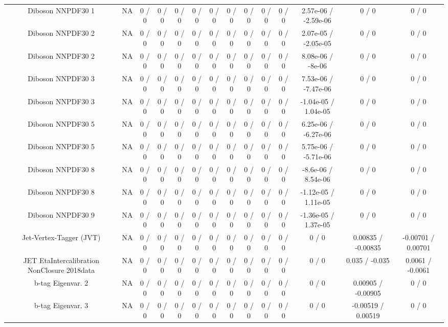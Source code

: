 \documentclass[10pt]{article}
\begin{document}
\begin{table}[htbp]
\begin{center}
\begin{tabular}{|c|c|c|c|c|c|c|c|c|c|c|c|c|c|}
  Diboson NNPDF30 1 &    NA    & 0 / 0 & 0 / 0 & 0 / 0 & 0 / 0 & 0 / 0 & 0 / 0 & 0 / 0 & 0 / 0 & 0 / 0 & 2.57e-06 / -2.59e-06 & 0 / 0 & 0 / 0 \\ 
  Diboson NNPDF30 2 &    NA    & 0 / 0 & 0 / 0 & 0 / 0 & 0 / 0 & 0 / 0 & 0 / 0 & 0 / 0 & 0 / 0 & 0 / 0 & 2.07e-05 / -2.05e-05 & 0 / 0 & 0 / 0 \\ 
  Diboson NNPDF30 2 &    NA    & 0 / 0 & 0 / 0 & 0 / 0 & 0 / 0 & 0 / 0 & 0 / 0 & 0 / 0 & 0 / 0 & 0 / 0 & 8.08e-06 / -8e-06 & 0 / 0 & 0 / 0 \\ 
  Diboson NNPDF30 3 &    NA    & 0 / 0 & 0 / 0 & 0 / 0 & 0 / 0 & 0 / 0 & 0 / 0 & 0 / 0 & 0 / 0 & 0 / 0 & 7.53e-06 / -7.47e-06 & 0 / 0 & 0 / 0 \\ 
  Diboson NNPDF30 3 &    NA    & 0 / 0 & 0 / 0 & 0 / 0 & 0 / 0 & 0 / 0 & 0 / 0 & 0 / 0 & 0 / 0 & 0 / 0 & -1.04e-05 / 1.04e-05 & 0 / 0 & 0 / 0 \\ 
  Diboson NNPDF30 5 &    NA    & 0 / 0 & 0 / 0 & 0 / 0 & 0 / 0 & 0 / 0 & 0 / 0 & 0 / 0 & 0 / 0 & 0 / 0 & 6.25e-06 / -6.27e-06 & 0 / 0 & 0 / 0 \\ 
  Diboson NNPDF30 5 &    NA    & 0 / 0 & 0 / 0 & 0 / 0 & 0 / 0 & 0 / 0 & 0 / 0 & 0 / 0 & 0 / 0 & 0 / 0 & 5.75e-06 / -5.71e-06 & 0 / 0 & 0 / 0 \\ 
  Diboson NNPDF30 8 &    NA    & 0 / 0 & 0 / 0 & 0 / 0 & 0 / 0 & 0 / 0 & 0 / 0 & 0 / 0 & 0 / 0 & 0 / 0 & -8.6e-06 / 8.54e-06 & 0 / 0 & 0 / 0 \\ 
  Diboson NNPDF30 8 &    NA    & 0 / 0 & 0 / 0 & 0 / 0 & 0 / 0 & 0 / 0 & 0 / 0 & 0 / 0 & 0 / 0 & 0 / 0 & -1.12e-05 / 1.11e-05 & 0 / 0 & 0 / 0 \\ 
  Diboson NNPDF30 9 &    NA    & 0 / 0 & 0 / 0 & 0 / 0 & 0 / 0 & 0 / 0 & 0 / 0 & 0 / 0 & 0 / 0 & 0 / 0 & -1.36e-05 / 1.37e-05 & 0 / 0 & 0 / 0 \\ 
  Jet-Vertex-Tagger (JVT) &    NA    & 0 / 0 & 0 / 0 & 0 / 0 & 0 / 0 & 0 / 0 & 0 / 0 & 0 / 0 & 0 / 0 & 0 / 0 & 0 / 0 & 0.00835 / -0.00835 & -0.00701 / 0.00701 \\ 
  JET EtaIntercalibration NonClosure 2018data &    NA    & 0 / 0 & 0 / 0 & 0 / 0 & 0 / 0 & 0 / 0 & 0 / 0 & 0 / 0 & 0 / 0 & 0 / 0 & 0 / 0 & 0.035 / -0.035 & 0.0061 / -0.0061 \\ 
  b-tag Eigenvar. 2 &    NA    & 0 / 0 & 0 / 0 & 0 / 0 & 0 / 0 & 0 / 0 & 0 / 0 & 0 / 0 & 0 / 0 & 0 / 0 & 0 / 0 & 0.00905 / -0.00905 & 0 / 0 \\ 
  b-tag Eigenvar. 3 &    NA    & 0 / 0 & 0 / 0 & 0 / 0 & 0 / 0 & 0 / 0 & 0 / 0 & 0 / 0 & 0 / 0 & 0 / 0 & 0 / 0 & -0.00519 / 0.00519 & 0 / 0 \\ 

\end{tabular}
\end{center}
\end{table}
\end{document}
